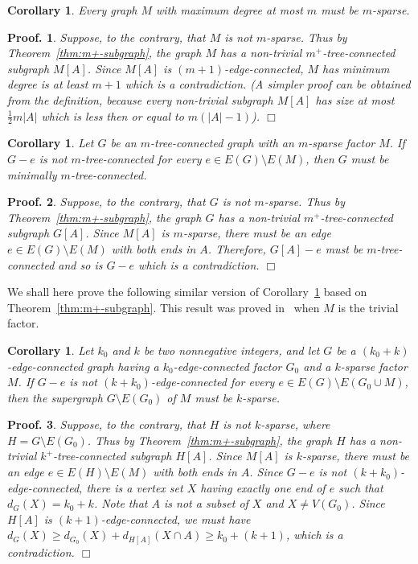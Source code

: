 \documentclass[10pt,bezier]{article}
\newtheorem{precor}[prethm]{{\bf Corollary}}
\newenvironment{cor}{\begin{precor}{\hspace{-0.5
em}{\bf.}}}{\end{precor}}
\newtheorem{preproof}{{\bf Proof.}}
\newenvironment{proof}[1]{\begin{preproof}{\rm
#1}\hfill{$\Box$}}{\end{preproof}}
\begin{document}
%
\begin{cor}\label{cor:maximum-degree:sparse}
{Every graph $M$ with maximum degree at most $m$ must be $m$-sparse.
}\end{cor}
%
\begin{proof}
{Suppose, to the contrary, that $M$ is not $m$-sparse. Thus
 by Theorem~\ref{thm:m+-subgraph}, the graph $M$ has a non-trivial $m^+$-tree-connected subgraph $M[A]$.
Since $M[A]$ is $(m+1)$-edge-connected, $M$ has minimum degree is at least $m+1$ which is a contradiction.
(A simpler proof can be obtained from the definition, because every non-trivial subgraph $M[A]$ has size at most $\frac{1}{2}m |A|$
which is less then or equal to $m(|A|-1)$).
}\end{proof}
%
%
\begin{cor}\label{cor:basictool:minimaly-tree-connected:M}
{Let $G$ be an $m$-tree-connected graph with an $m$-sparse factor $M$.
 If $G-e$ is not $m$-tree-connected for every $e\in E(G)\setminus E(M)$, then $G$ must be minimally $m$-tree-connected.
}\end{cor}
\begin{proof}
{Suppose, to the contrary, that $G$ is not $m$-sparse. Thus
 by Theorem~\ref{thm:m+-subgraph}, the graph $G$ has a non-trivial $m^+$-tree-connected subgraph $G[A]$.
Since $M[A]$ is $m$-sparse, there must be an edge $e\in E(G)\setminus E(M)$ with both ends in $A$.
Therefore, $G[A]-e$ must be $m$-tree-connected and so is $G-e$ which is a contradiction.
}\end{proof}
%
We shall here prove the following similar version of Corollary~\ref{cor:basictool:minimaly-tree-connected:M} based on Theorem~\ref{thm:m+-subgraph}. This result was proved in~\cite{Nagamochi-Ibaraki-1992, Nishizeki-Poljak-1994} when $M$ is the trivial factor. 
%
\begin{cor}
{Let $k_0$ and $k$ be two nonnegative integers, and
let $G$ be a $(k_0+k)$-edge-connected graph having a $k_0$-edge-connected factor $G_0$ and a $k$-sparse factor $M$.
If $G-e$ is not $(k+k_0)$-edge-connected for every $e\in E(G)\setminus E(G_0 \cup M )$, then 
 the supergraph $G\setminus E(G_0)$ of $M$ must be $k$-sparse.
}\end{cor}
%
\begin{proof}
{Suppose, to the contrary, that $H$ is not $k$-sparse, where $H=G\setminus E(G_0)$. Thus
 by Theorem~\ref{thm:m+-subgraph}, the graph $H$ has a non-trivial $k^+$-tree-connected subgraph $H[A]$.
Since $M[A]$ is $k$-sparse, there must be an edge $e\in E(H)\setminus E(M)$ with both ends in $A$.
Since $G-e$ is not $(k+k_0)$-edge-connected, there is a vertex set $X$ having exactly one end of $e$ such that $d_G(X)=k_0+k$.
Note that $A$ is not a subset of $X$ and $X \neq V(G_0)$. Since $H[A]$ is $(k+1)$-edge-connected, we must have
 $d_G(X)\ge d_{G_0}(X) + d_{H[A]}(X\cap A)\ge k_0 +(k+1)$, which is a contradiction.
}\end{proof}
%
%
\end{document}
